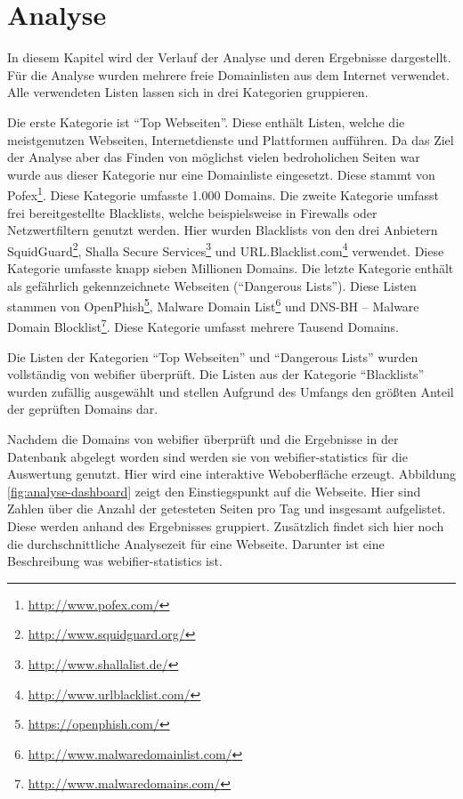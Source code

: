 \chapter{Analyse}

In diesem Kapitel wird der Verlauf der Analyse und deren Ergebnisse dargestellt. Für die Analyse wurden mehrere freie Domainlisten aus dem Internet verwendet. Alle verwendeten Listen lassen sich in drei Kategorien gruppieren.

Die erste Kategorie ist \enquote{Top Webseiten}. Diese enthält Listen, welche die meistgenutzen Webseiten, Internetdienste und Plattformen aufführen. Da das Ziel der Analyse aber das Finden von möglichst vielen bedroholichen Seiten war wurde aus dieser Kategorie nur eine Domainliste eingesetzt. Diese stammt von Pofex\footnote{\url{http://www.pofex.com/}}. Diese Kategorie umfasste 1.000 Domains. Die zweite Kategorie umfasst frei bereitgestellte Blacklists, welche beispielsweise in Firewalls oder Netzwertfiltern genutzt werden. Hier wurden Blacklists von den drei Anbietern SquidGuard\footnote{\url{http://www.squidguard.org/}}, Shalla Secure Services\footnote{\url{http://www.shallalist.de/}} und URL.Blacklist.com\footnote{\url{http://www.urlblacklist.com/}} verwendet. Diese Kategorie umfasste knapp sieben Millionen Domains. Die letzte Kategorie enthält als gefährlich gekennzeichnete Webseiten (\enquote{Dangerous Lists}). Diese Listen stammen von OpenPhish\footnote{\url{https://openphish.com/}}, Malware Domain List\footnote{\url{http://www.malwaredomainlist.com/}} und DNS-BH – Malware Domain Blocklist\footnote{\url{http://www.malwaredomains.com/}}. Diese Kategorie umfasst mehrere Tausend Domains.

Die Listen der Kategorien \enquote{Top Webseiten} und \enquote{Dangerous Lists} wurden vollständig von webifier überprüft. Die Listen aus der Kategorie \enquote{Blacklists} wurden zufällig ausgewählt und stellen Aufgrund des Umfangs den größten Anteil der geprüften Domains dar.

Nachdem die Domains von webifier überprüft und die Ergebnisse in der Datenbank abgelegt worden sind werden sie von webifier-statistics für die Auswertung genutzt. Hier wird eine interaktive Weboberfläche erzeugt. Abbildung \ref{fig:analyse-dashboard} zeigt den Einstiegspunkt auf die Webseite. Hier sind Zahlen über die Anzahl der getesteten Seiten pro Tag und insgesamt aufgelistet. Diese werden anhand des Ergebnisses gruppiert. Zusätzlich findet sich hier noch die durchschnittliche Analysezeit für eine Webseite. Darunter ist eine Beschreibung was webifier-statistics ist.

